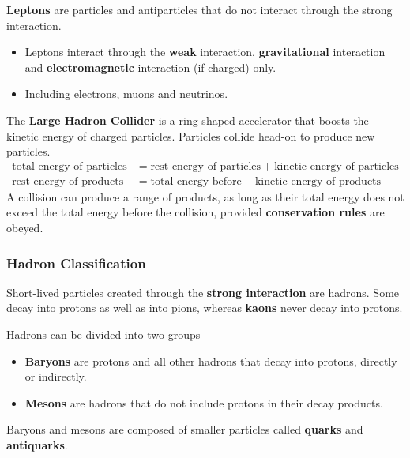 \textbf{Leptons} are particles and antiparticles that do not interact through the strong interaction.
\begin{itemize}
    \item Leptons interact through the \textbf{weak} interaction, \textbf{gravitational} interaction and \textbf{electromagnetic} interaction (if charged) only.
    \item Including electrons, muons and neutrinos.
\end{itemize}

The \textbf{Large Hadron Collider} is a ring-shaped accelerator that boosts the kinetic energy of charged particles. Particles collide head-on to produce new particles.
\begin{align*}
    \text{total energy of particles}&=\text{rest energy of particles}+\text{kinetic energy of particles}\\
    \text{rest energy of products}&=\text{total energy before}-\text{kinetic energy of products}
\end{align*}
A collision can produce a range of products, as long as their total energy does not exceed the total energy before the collision, provided \textbf{conservation rules} are obeyed.

\subsubsection*{Hadron Classification}
Short-lived particles created through the \textbf{strong interaction} are hadrons. Some decay into protons as well as into pions, whereas \textbf{kaons} never decay into protons.

Hadrons can be divided into two groups
\begin{itemize}
    \item \textbf{Baryons} are protons and all other hadrons that decay into protons, directly or indirectly.
    \item \textbf{Mesons} are hadrons that do not include protons in their decay products.
\end{itemize}

Baryons and mesons are composed of smaller particles called \textbf{quarks} and \textbf{antiquarks}.
